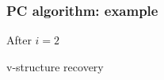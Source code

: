 \documentclass{beamer}
\begin{document}
\begin{frame}
    \frametitle{PC algorithm: example}
    \begin{flushleft}
        After $i=2$
    \end{flushleft}
    \begin{flushleft}
        v-structure recovery
    \end{flushleft}
\end{frame}
\end{document}
